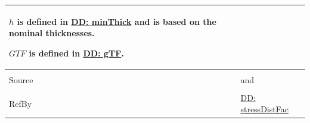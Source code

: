 \documentclass[12pt]{article}
\begin{document}
\begin{minipage}{\textwidth}
\begin{tabular}{>{\raggedright}p{}>{\raggedright\arraybackslash}p{}}
        $h$ is defined in \hyperref[DD:minThick]{DD: minThick} and is based on the nominal thicknesses.
        
        $GTF$ is defined in \hyperref[DD:gTF]{DD: gTF}.
        
\\ \midrule \\
Source & \cite{astm2009} and \cite[(Eq. 7)]{campidelli}
         
\\ \midrule \\
RefBy & \hyperref[DD:stressDistFac]{DD: stressDistFac}
        
\\ \bottomrule
\end{tabular}
\end{minipage}

\vspace{\baselineskip}
\noindent
\end{document}
